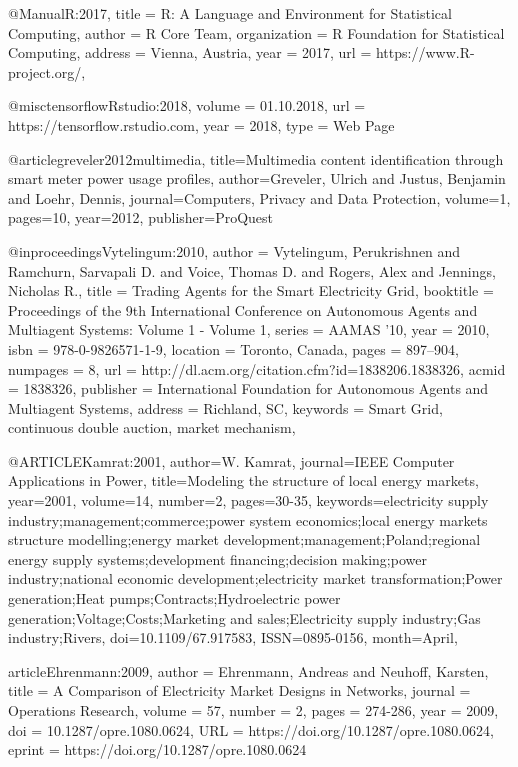 @Manual{R:2017,
    title = {R: A Language and Environment for Statistical Computing},
    author = {{R Core Team}},
    organization = {R Foundation for Statistical Computing},
    address = {Vienna, Austria},
    year = {2017},
    url = {https://www.R-project.org/},
  }
  
  
@misc{tensorflowRstudio:2018,
   volume = {01.10.2018},
   url = {https://tensorflow.rstudio.com},
   year = {2018},
   type = {Web Page}
}

	
@article{greveler2012multimedia,
  title={Multimedia content identification through smart meter power usage profiles},
  author={Greveler, Ulrich and Justus, Benjamin and Loehr, Dennis},
  journal={Computers, Privacy and Data Protection},
  volume={1},
  pages={10},
  year={2012},
  publisher={ProQuest}
}

@inproceedings{Vytelingum:2010,
 author = {Vytelingum, Perukrishnen and Ramchurn, Sarvapali D. and Voice, Thomas D. and Rogers, Alex and Jennings, Nicholas R.},
 title = {Trading Agents for the Smart Electricity Grid},
 booktitle = {Proceedings of the 9th International Conference on Autonomous Agents and Multiagent Systems: Volume 1 - Volume 1},
 series = {AAMAS '10},
 year = {2010},
 isbn = {978-0-9826571-1-9},
 location = {Toronto, Canada},
 pages = {897--904},
 numpages = {8},
 url = {http://dl.acm.org/citation.cfm?id=1838206.1838326},
 acmid = {1838326},
 publisher = {International Foundation for Autonomous Agents and Multiagent Systems},
 address = {Richland, SC},
 keywords = {Smart Grid, continuous double auction, market mechanism},
} 


@ARTICLE{Kamrat:2001, 
author={W. Kamrat}, 
journal={IEEE Computer Applications in Power}, 
title={Modeling the structure of local energy markets}, 
year={2001}, 
volume={14}, 
number={2}, 
pages={30-35}, 
keywords={electricity supply industry;management;commerce;power system economics;local energy markets structure modelling;energy market development;management;Poland;regional energy supply systems;development financing;decision making;power industry;national economic development;electricity market transformation;Power generation;Heat pumps;Contracts;Hydroelectric power generation;Voltage;Costs;Marketing and sales;Electricity supply industry;Gas industry;Rivers}, 
doi={10.1109/67.917583}, 
ISSN={0895-0156}, 
month={April},}


article{Ehrenmann:2009,
author = {Ehrenmann, Andreas and Neuhoff, Karsten},
title = {A Comparison of Electricity Market Designs in Networks},
journal = {Operations Research},
volume = {57},
number = {2},
pages = {274-286},
year = {2009},
doi = {10.1287/opre.1080.0624},
URL = {https://doi.org/10.1287/opre.1080.0624},
eprint = {https://doi.org/10.1287/opre.1080.0624}
}



